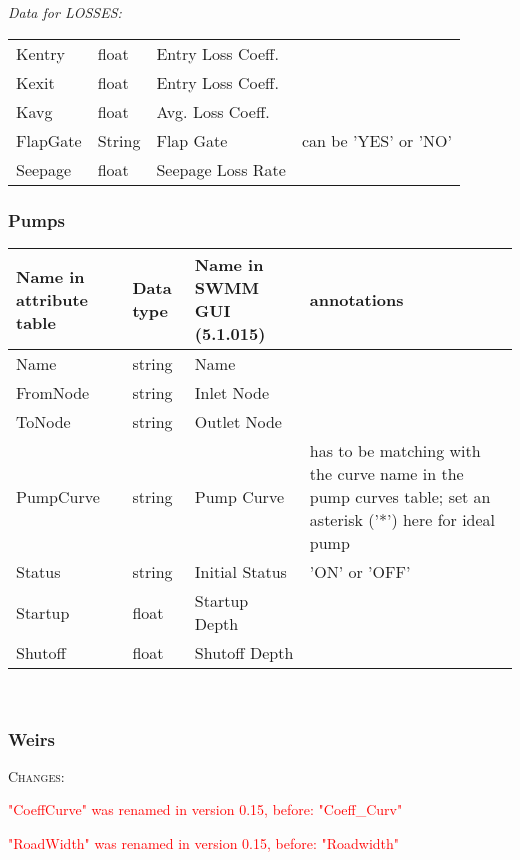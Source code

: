 \documentclass[10pt,a4paper,oneside]{scrbook}
\begin{document}
\\
\\
\textit{Data for LOSSES:}
\\
\begin{tabular}{p{1.7cm}|p{1.3cm}|P{3cm}|P{8cm}}
Kentry & float & Entry Loss Coeff. & \\
Kexit & float & Entry Loss Coeff. & \\
Kavg & float & Avg. Loss Coeff. & \\
FlapGate & String & Flap Gate & can be 'YES' or 'NO'\\
Seepage & float & Seepage Loss Rate& \\
\hline
\end{tabular}

\subsubsection{Pumps}
\begin{tabular}{p{1.7cm}|p{1.3cm}|P{3cm}|P{8cm}}
\hline 
\textbf{Name in attribute table} & \textbf{Data type} & \textbf{Name in SWMM GUI (5.1.015)} & \textbf{annotations}\\ 
\hline 
Name & string & Name & \\
FromNode & string & Inlet Node & \\ 
ToNode & string & Outlet Node&  \\ 
PumpCurve & string & Pump Curve & has to be matching with the curve name in the pump curves table; set an asterisk ('*') here for ideal pump \\
Status & string & Initial Status & 'ON' or 'OFF' \\
Startup & float & Startup Depth& \\
Shutoff & float & Shutoff Depth & \\
\hline
\end{tabular}
\\

\subsubsection{Weirs}
\textsc{Changes}:

\textcolor{red}{"CoeffCurve" was renamed in version 0.15, before: "Coeff\_Curv"}

\textcolor{red}{"RoadWidth" was renamed in version 0.15, before: "Roadwidth"}
\end{document}

